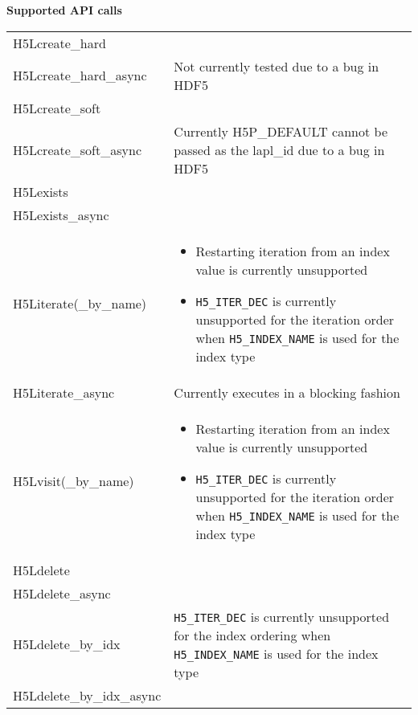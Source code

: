 \documentclass[../users_guide.tex]{subfiles}
\begin{document}
\begin{center}

\textbf{Supported API calls}
\vspace{.2in} \\

\begin{tabularx}{\linewidth}{| X | >{\RaggedRight}X |}
\hline
\rowcolor{lightgray!50}%
\multicolumn{1}{| c |}{\textbf{API call}} & \multicolumn{1}{c |}{\textbf{Notes}} \\ \hline

H5Lcreate\_hard & \\ \hline
H5Lcreate\_hard\_async & Not currently tested due to a bug in HDF5\\ \hline
H5Lcreate\_soft & \\ \hline
H5Lcreate\_soft\_async & Currently H5P\_DEFAULT cannot be passed as the lapl\_id due to a bug in HDF5\\ \hline
H5Lexists & \\ \hline
H5Lexists\_async & \\ \hline

H5Literate(\_by\_name) & \begin{itemize}
                             \item Restarting iteration from an index value is currently unsupported\footnotemark[1]
                             \item \texttt{H5\_ITER\_DEC} is currently unsupported for the iteration order when \texttt{H5\_INDEX\_NAME} is used for the index type
                         \end{itemize}\\ \hline

H5Literate\_async & Currently executes in a blocking fashion\\ \hline
H5Lvisit(\_by\_name) & \begin{itemize}
                             \item Restarting iteration from an index value is currently unsupported\footnotemark[1]
                             \item \texttt{H5\_ITER\_DEC} is currently unsupported for the iteration order when \texttt{H5\_INDEX\_NAME} is used for the index type
                         \end{itemize}\\ \hline
H5Ldelete & \\ \hline
H5Ldelete\_async & \\ \hline
H5Ldelete\_by\_idx & \texttt{H5\_ITER\_DEC} is currently unsupported for the index ordering when \texttt{H5\_INDEX\_NAME} is used for the index type\\ \hline
H5Ldelete\_by\_idx\_async & \\ \hline


\end{tabularx}
\end{center}
\end{document}
